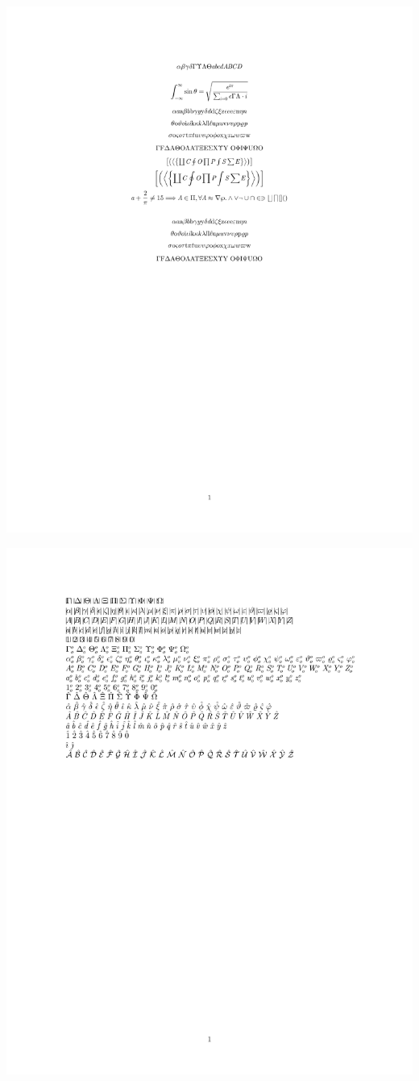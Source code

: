 \documentclass[twocolumn]{article}
\begin{document}
 \noindent\includegraphics*{../results/cmr-font}\par
{} \noindent\includegraphics*{../results/cmr-pos}\par
\end{document}
